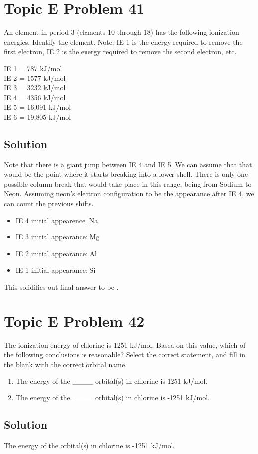 \documentclass[10pt]{article}
\begin{document}
    \pagebreak
    \section{Topic E Problem 41}
        An element in period 3 (elements 10 through 18) has the following ionization energies.
        Identify the element. 
        Note: IE 1 is the energy required to remove the first electron, IE 2 is the energy required to remove the second electron, etc.
        \begin{multicols}{3}
            IE 1 = 787 kJ/mol\\
            IE 2 = 1577 kJ/mol\\
            IE 3 = 3232 kJ/mol\\
            IE 4 = 4356 kJ/mol\\
            IE 5 = 16,091 kJ/mol\\
            IE 6 = 19,805 kJ/mol
        \end{multicols}

        \subsection{Solution}
            Note that there is a giant jump between IE 4 and IE 5.
            We can assume that that would be the point where it starts breaking into a lower shell.
            There is only one possible column break that would take place in this range, being from Sodium to Neon.
            Assuming neon's electron configuration to be the appearance after IE 4, we can count the previous shifts.
            \begin{itemize}
                \item   IE 4 initial appearence: Na
                \item   IE 3 initial appearance: Mg
                \item   IE 2 initial appearance: Al
                \item   IE 1 initial appearance: Si
            \end{itemize}

            This solidifies out final answer to be .

    \section{Topic E Problem 42}
        The ionization energy of chlorine is 1251 kJ/mol. 
        Based on this value, which of the following conclusions is reasonable? 
        Select the correct statement, and fill in the blank with the correct orbital name.
        \begin{enumerate}[label=\alph*)]
            \item   The energy of the \_\_\_\_ orbital(s) in chlorine is 1251 kJ/mol.
            \item   The energy of the \_\_\_\_ orbital(s) in chlorine is -1251 kJ/mol.
        \end{enumerate}

        \subsection{Solution}
            The energy of the  orbital(s) in chlorine is -1251 kJ/mol.

    \pagebreak

    \tableofcontents
\end{document}
